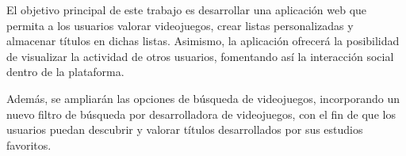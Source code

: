 El objetivo principal de este trabajo es desarrollar una aplicación web que permita a los usuarios valorar videojuegos, 
crear listas personalizadas y almacenar títulos en dichas listas. Asimismo, la aplicación ofrecerá la posibilidad de visualizar 
la actividad de otros usuarios, fomentando así la interacción social dentro de la plataforma.

Además, se ampliarán las opciones de búsqueda de videojuegos, incorporando un nuevo filtro de búsqueda por desarrolladora
de videojuegos, con el fin de que los usuarios puedan descubrir y valorar títulos desarrollados por sus estudios favoritos.